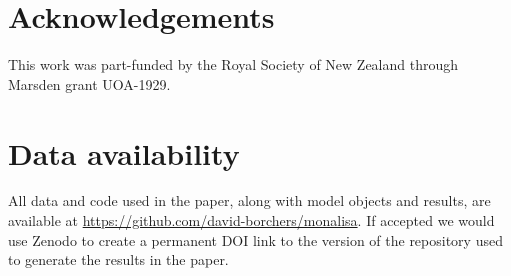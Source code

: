\documentclass[useAMS,usenatbib,referee]{biom}
\begin{document}



\section*{Acknowledgements}

This work was part-funded by the Royal Society of New Zealand through Marsden grant UOA-1929.

%

\section*{Data availability}

All data and code used in the paper, along with model objects and results, are available at \url{https://github.com/david-borchers/monalisa}. If accepted we would use Zenodo to create a permanent DOI link to the version of the repository used to generate the results in the paper.




\end{document}
